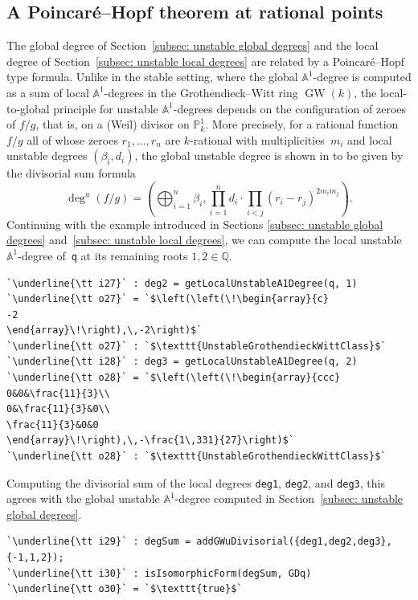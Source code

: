 \documentclass[12pt]{amsart}
\theoremstyle{definition}
\DeclareMathOperator{\GW}{GW}
\begin{document}
\subsection{A Poincar\'{e}--Hopf theorem at rational points}\label{subec: PH rational points}
The global degree of Section~\ref{subsec: unstable global degrees} and the local degree of Section~\ref{subsec: unstable local degrees} are related by a Poincar\'{e}--Hopf type formula. Unlike in the stable setting, where the global $\mathbb{A}^{1}$-degree is computed as a sum of local $\mathbb{A}^{1}$-degrees in the Grothendieck--Witt ring $\GW(k)$, the local-to-global principle for unstable $\mathbb{A}^{1}$-degrees depends on the configuration of zeroes of $f/g$, that is, on a (Weil) divisor on $\mathbb{P}^{1}_{k}$. More precisely, for a rational function $f/g$ all of whose zeroes $r_{1},\dots,r_{n}$ are $k$-rational with multiplicities~$m_{i}$ and local unstable degrees $(\beta_{i},d_{i})$, the global unstable degree is shown in \cite[Theorem~1.1]{IMSTW} to be given by the divisorial sum formula
\[\deg^{u}(f/g) = \left(\bigoplus_{i=1}^{n}\beta_{i},\prod_{i=1}^{n}d_{i}\cdot\prod_{i<j}(r_{i}-r_{j})^{2m_{i}m_{j}}\right).\]
Continuing with the example introduced in Sections \ref{subsec: unstable global degrees} and~\ref{subsec: unstable local degrees}, we can compute the local unstable $\mathbb{A}^{1}$-degree of~\texttt{q} at its remaining roots $1,2\in\mathbb{Q}$.
\begin{lstlisting}[language=Macaulay2output]
`\underline{\tt i27}` : deg2 = getLocalUnstableA1Degree(q, 1)
`\underline{\tt o27}` = `$\left(\left(\!\begin{array}{c}
-2
\end{array}\!\right),\,-2\right)$`
`\underline{\tt o27}` : `$\texttt{UnstableGrothendieckWittClass}$`
`\underline{\tt i28}` : deg3 = getLocalUnstableA1Degree(q, 2)
`\underline{\tt o28}` = `$\left(\left(\!\begin{array}{ccc}
0&0&\frac{11}{3}\\
0&\frac{11}{3}&0\\
\frac{11}{3}&0&0
\end{array}\!\right),\,-\frac{1\,331}{27}\right)$`
`\underline{\tt o28}` : `$\texttt{UnstableGrothendieckWittClass}$`
\end{lstlisting}
Computing the divisorial sum of the local degrees \texttt{deg1}, \texttt{deg2}, and \texttt{deg3}, this agrees with the global unstable $\mathbb{A}^{1}$-degree computed in Section~\ref{subsec: unstable global degrees}. 
\begin{lstlisting}[language=Macaulay2output]
`\underline{\tt i29}` : degSum = addGWuDivisorial({deg1,deg2,deg3}, {-1,1,2});
`\underline{\tt i30}` : isIsomorphicForm(degSum, GDq)
`\underline{\tt o30}` = `$\texttt{true}$`
\end{lstlisting}
\end{document}
